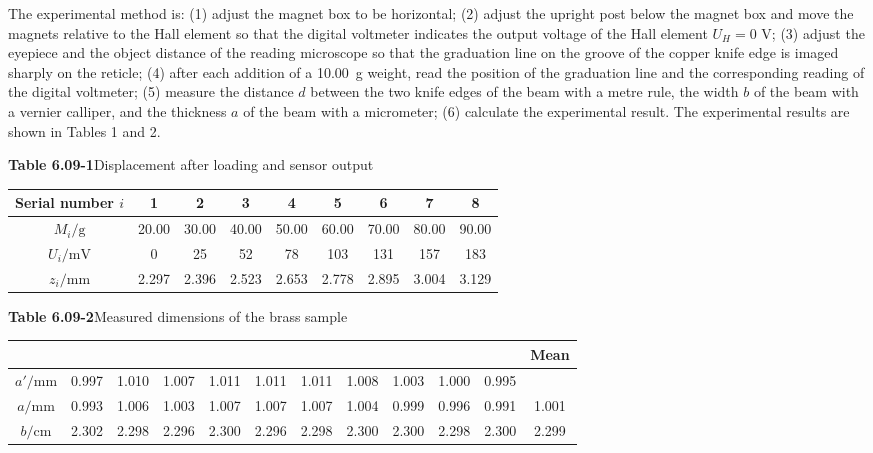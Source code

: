 The experimental method is: (1) adjust the magnet box to be horizontal; (2) adjust the upright post below the magnet box and move the magnets relative to the Hall element so that the digital voltmeter indicates the output voltage of the Hall element $U_H=0$ V; (3) adjust the eyepiece and the object distance of the reading microscope so that the graduation line on the groove of the copper knife edge is imaged sharply on the reticle; (4) after each addition of a \SI{10.00}{g} weight, read the position of the graduation line and the corresponding reading of the digital voltmeter; (5) measure the distance $d$ between the two knife edges of the beam with a metre rule, the width $b$ of the beam with a vernier calliper, and the thickness $a$ of the beam with a micrometer; (6) calculate the experimental result. The experimental results are shown in Tables 1 and 2.

\begin{center}
\textbf{Table 6.09-1}\quad Displacement after loading and sensor output\\[3pt]
\begin{tabular}{ccccccccc}
\toprule
Serial number $i$ & 1 & 2 & 3 & 4 & 5 & 6 & 7 & 8\\
\midrule
$M_i/\mathrm{g}$ & 20.00 & 30.00 & 40.00 & 50.00 & 60.00 & 70.00 & 80.00 & 90.00\\
$U_i/\mathrm{mV}$ & 0 & 25 & 52 & 78 & 103 & 131 & 157 & 183\\
$z_i/\mathrm{mm}$ & 2.297 & 2.396 & 2.523 & 2.653 & 2.778 & 2.895 & 3.004 & 3.129\\
\bottomrule
\end{tabular}
\end{center}

\begin{center}
\textbf{Table 6.09-2}\quad Measured dimensions of the brass sample\\[3pt]
\small
\setlength{\tabcolsep}{2.2pt}
\begin{tabular}{cccccccccccc}
\toprule
\multicolumn{11}{c}{} & Mean\\
\midrule
$a'/\mathrm{mm}$ & 0.997 & 1.010 & 1.007 & 1.011 & 1.011 & 1.011 & 1.008 & 1.003 & 1.000 & 0.995 & \\
$a/\mathrm{mm}$  & 0.993 & 1.006 & 1.003 & 1.007 & 1.007 & 1.007 & 1.004 & 0.999 & 0.996 & 0.991 & 1.001\\
$b/\mathrm{cm}$  & 2.302 & 2.298 & 2.296 & 2.300 & 2.296 & 2.298 & 2.300 & 2.300 & 2.298 & 2.300 & 2.299\\
\bottomrule
\end{tabular}
\end{center}

